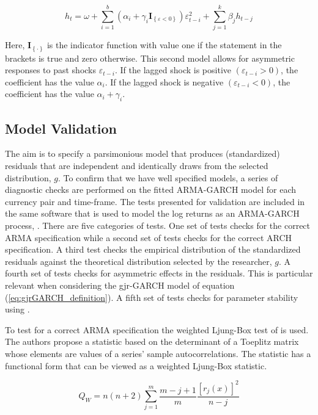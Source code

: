 \begin{equation} \label{eq:gjrGARCH_definition}
	h_{t} = \omega + \sum_{i = 1}^{b}\left(\alpha_{i} + \gamma_{i}\mathbf{I}_{\left\{\varepsilon < 0 \right\}}\right) \varepsilon_{t - i}^{2} + \sum_{j = 1}^{k}\beta_{j}h_{t- j}
\end{equation}

Here, $\mathbf{I}_{\left\{ \cdot \right\}}$ is the indicator function with value one if the statement in the brackets is true and zero otherwise. This second model allows for asymmetric responses to past shocks $\varepsilon_{t-i}$. If the lagged shock is positive $\left(\varepsilon_{t-i}>0\right)$, the coefficient has the value $\alpha_{i}$. If the lagged shock is negative $\left(\varepsilon_{t-i} < 0 \right)$, the coefficient has the value $\alpha_{i} + \gamma_{i}$.

\subsection{Model Validation}

The aim is to specify a parsimonious model that produces (standardized) residuals that are independent and identically draws from the selected distribution, $g$. To confirm that we have well specified models, a series of diagnostic checks are performed on the fitted ARMA-GARCH model for each currency pair and time-frame. The tests presented for validation are included in the same software that is used to model the log returns as an ARMA-GARCH process, \cite{Rugarch}. There are five categories of tests. One set of tests checks for the correct ARMA specification while a second set of tests checks for the correct ARCH specification. A third test checks the empirical distribution of the standardized residuals against the theoretical distribution selected by the researcher, $g$. A fourth set of tests checks for asymmetric effects in the residuals. This is particular relevant when considering the gjr-GARCH model of equation (\ref{eq:gjrGARCH_definition}). A fifth set of tests checks for parameter stability using \cite{NYBLOM_1989}. 

To test for a correct ARMA specification the weighted Ljung-Box test of \cite{Fisher_Gallagher_2012} is used. The authors propose a statistic based on the determinant of a Toeplitz matrix whose elements are values of a series' sample autocorrelations. The statistic has a functional form that can be viewed as a weighted Ljung-Box statistic.

\begin{equation} \label{eq:wtd_ljung_box_arma_test}
	Q_{W} = n(n + 2) \sum_{j=1}^{m} \frac{m - j + 1}{m} \frac{[r_{j}(x)]^{2}}{n - j}
\end{equation}

